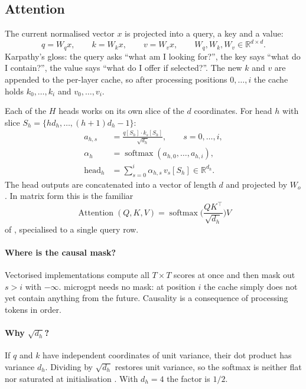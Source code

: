 \documentclass[11pt,letterpaper]{article}
\theoremstyle{remark}
\newcommand{\R}{\mathbb{R}}
\newcommand{\softmax}{\operatorname{softmax}}
\begin{document}
\subsection{Attention}
\label{sec:attention}

The current normalised vector $x$ is projected into a query, a key and a value:
\begin{equation}
q = W_q x,\qquad k = W_k x,\qquad v = W_v x,\qquad W_q,W_k,W_v\in\R^{d\times d}.
\end{equation}
Karpathy's gloss: the query asks ``what am I looking for?'', the key says ``what do I contain?'', the value says ``what do I offer if selected?''. The new $k$ and $v$ are appended to the per-layer cache, so after processing positions $0,\dots,i$ the cache holds $k_0,\dots,k_i$ and $v_0,\dots,v_i$.

Each of the $H$ heads works on its own slice of the $d$ coordinates. For head $h$ with slice $S_h = \{h d_h,\dots,(h+1)d_h-1\}$:
\begin{align}
a_{h,s} &= \frac{q[S_h]\cdot k_s[S_h]}{\sqrt{d_h}},\qquad s=0,\dots,i, \label{eq:attnlogit}\\
\alpha_{h} &= \softmax(a_{h,0},\dots,a_{h,i}), \label{eq:attnw}\\
\mathrm{head}_h &= \sum_{s=0}^{i}\alpha_{h,s}\, v_s[S_h]\in\R^{d_h}. \label{eq:headout}
\end{align}
The head outputs are concatenated into a vector of length $d$ and projected by $W_o$. In matrix form this is the familiar
\begin{equation}
\operatorname{Attention}(Q,K,V) = \softmax\!\Big(\frac{QK^{\top}}{\sqrt{d_h}}\Big)V
\end{equation}
of \textcite{vaswani2017attention}, specialised to a single query row.

\paragraph{Where is the causal mask?} Vectorised implementations compute all $T\times T$ scores at once and then mask out $s>i$ with $-\infty$. microgpt needs no mask: at position $i$ the cache simply does not yet contain anything from the future. Causality is a consequence of processing tokens in order.

\paragraph{Why $\sqrt{d_h}$?} If $q$ and $k$ have independent coordinates of unit variance, their dot product has variance $d_h$. Dividing by $\sqrt{d_h}$ restores unit variance, so the softmax is neither flat nor saturated at initialisation \parencite{vaswani2017attention}. With $d_h=4$ the factor is $1/2$.
\end{document}
